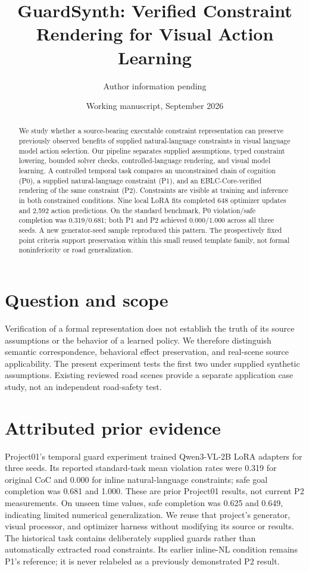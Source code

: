 \documentclass[11pt]{article}
\title{GuardSynth: Verified Constraint Rendering for Visual Action Learning}
\author{Author information pending}
\date{Working manuscript, September 2026}
\begin{document}
\maketitle
\begin{abstract}
We study whether a source-bearing executable constraint representation can preserve
previously observed benefits of supplied natural-language constraints in visual
language model action selection. Our pipeline separates supplied assumptions,
typed constraint lowering, bounded solver checks, controlled-language rendering,
and visual model learning. A controlled temporal task compares an unconstrained
chain of cognition (P0), a supplied natural-language constraint (P1), and an
EBLC-Core-verified rendering of the same constraint (P2). Constraints are visible
at training and inference in both constrained conditions. Nine local LoRA fits
completed 648 optimizer updates and 2,592 action predictions. On the standard
benchmark, P0 violation/safe completion was 0.319/0.681; both P1 and P2 achieved
0.000/1.000 across all three seeds. A new generator-seed sample reproduced this
pattern. The prospectively fixed point criteria support preservation within this
small reused template family, not formal noninferiority or road generalization.
\end{abstract}
\section{Question and scope}
Verification of a formal representation does not establish the truth of its
source assumptions or the behavior of a learned policy. We therefore distinguish
semantic correspondence, behavioral effect preservation, and real-scene source
applicability. The present experiment tests the first two under supplied synthetic
assumptions. Existing reviewed road scenes provide a separate application case
study, not an independent road-safety test.
\section{Attributed prior evidence}
Project01's temporal guard experiment trained Qwen3-VL-2B LoRA adapters for three
seeds. Its reported standard-task mean violation rates were 0.319 for original
CoC and 0.000 for inline natural-language constraints; safe goal completion was
0.681 and 1.000. These are prior Project01 results, not current P2 measurements.
On unseen time values, safe completion was 0.625 and 0.649, indicating limited
numerical generalization. We reuse that project's generator, visual processor,
and optimizer harness without modifying its source or results.
The historical task contains deliberately supplied guards rather than automatically
extracted road constraints. Its earlier inline-NL condition remains P1's reference;
it is never relabeled as a previously demonstrated P2 result.
\end{document}
